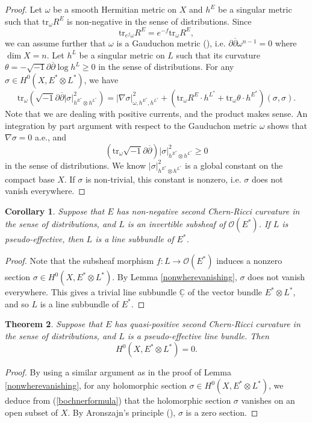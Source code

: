\documentclass[11pt]{amsart}
\newcommand\sO{{\mathscr O}}
\newcommand\bp{{\bar\partial}}
\theoremstyle{plain}
\newtheorem{thm}{Theorem}[section]
\newtheorem{cor}[thm]{Corollary}
\theoremstyle{definition}
\newcommand{\btheorem}{\begin{thm}}
\newcommand{\etheorem}{\end{thm}}
\newcommand{\bcorollary}{\begin{cor}}
\newcommand{\ecorollary}{\end{cor}}
\newcommand{\bproof}{\begin{proof}}
\newcommand{\eproof}{\end{proof}}
\newcommand{\sq}{\sqrt{-1}}
\newcommand{\p}{\partial}
\renewcommand{\bar}{\overline}
\newcommand{\beq}{\begin{equation}}
\newcommand{\eeq}{\end{equation}}
\renewcommand{\bp}{\bar{\partial}}
\newcommand{\ts}{\otimes}
\renewcommand{\>}{\rightarrow}
\newcommand{\C}{{\mathbb C}}
\numberwithin{equation}{section} %
\begin{document}
	\bproof Let $\omega$ be a smooth Hermitian metric on $X$ and $h^E$ be a singular metric such that $\mathrm{tr}_\omega R^E$ is non-negative in the sense of distributions.
	Since $$\mathrm{tr}_{e^f\omega} R^{E}=e^{-f}\mathrm{tr}_\omega R^E,$$
	we can assume further that $\omega$ is a Gauduchon metric (\cite{Gauduchon1977}), i.e. $\p\bp\omega^{n-1}=0$
	where $\dim X=n$. Let $h^L$ be a singular metric on $L$ such that its curvature $\theta=-\sq\p\bp\log h^L\geq 0$
	in the sense of distributions. For any $\sigma\in H^0(X,E^*\ts L^*)$, we have
	\beq\mathrm{tr}_\omega\left(\sq \p\bp |\sigma|^2_{h^{E^*}\ts h^{L^*}}\right)
	=|\nabla \sigma|^2_{\omega,h^{E^*},h^{L^*}}+(\mathrm{tr}_\omega R^E\cdot h^{L^*}+\mathrm{tr}_\omega\theta\cdot h^{E^*})(\sigma,\sigma).\label{bochnerformula}\eeq
	Note that we are dealing with positive currents, and the product makes sense.
	An integration by part argument with respect to the Gauduchon metric $\omega$  shows that $\nabla\sigma=0$ a.e., and
	\beq (\mathrm{tr}_\omega\sq\p\bp) |\sigma|^2_{h^{E^*}\ts h^{L^*}}\geq 0 \eeq
	in the sense of distributions.  We know $|\sigma|^2_{h^{E^*}\ts h^{L^*}}$ is a global constant on the compact base $X$.
	If $\sigma$ is non-trivial, this constant is nonzero, i.e. $\sigma$ does not vanish everywhere.
	\eproof
	
	\bcorollary\label{subsheafsubbundle} Suppose that $E$ has non-negative second Chern-Ricci curvature  in the  sense of distributions, and  $L$ is an invertible
	subsheaf of $\sO(E^*)$. If $L$ is pseudo-effective, then $L$ is a line subbundle of $E^*$.
	\ecorollary
	
	\bproof Note that the subsheaf morphism $f: L\> \sO(E^*)$ induces a nonzero section $\sigma \in H^0(X,E^*\ts L^*)$. By Lemma \ref{nonwherevanishing},
	$\sigma$ does not vanish everywhere. This gives a trivial line subbundle  $\underline{\C}$ of the vector bundle $E^*\ts L^*$, and so $L$ is a line subbundle of $E^*$.
	\eproof
	
	
	
	\btheorem\label{distributionvanishing} Suppose that $E$ has quasi-positive second Chern-Ricci curvature  in the  sense of distributions, and  $L$ is a pseudo-effective line bundle. Then
	\beq H^0(X,E^*\ts L^*)=0.\eeq
	\etheorem
	
	\bproof By using a similar argument as in the proof of Lemma \ref{nonwherevanishing}, for any holomorphic section $\sigma\in H^0(X,E^*\ts L^*)$,
	we deduce  from (\ref{bochnerformula}) that the holomorphic section $\sigma$ vanishes on an open subset of $X$. By Aronszajn's principle (\cite{Aronszajn1957}), $\sigma$ is a zero section.
	\eproof
	
\end{document}

